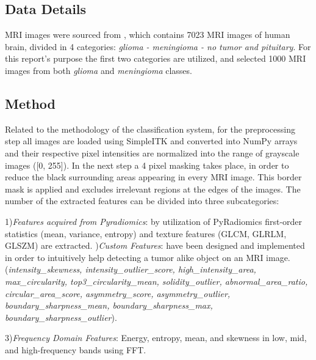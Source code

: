 \documentclass[11pt,a4paper]{article}
\begin{document}
    \subsection{Data Details}
	MRI images were sourced from \cite{data}, which contains 7023 MRI images of human brain, divided 
	in 4 categories: \textit{glioma - meningioma - no tumor and pituitary}.
	For this report's purpose the first two categories are utilized, and selected 1000 MRI images from both \textit{glioma} and
	\textit{meningioma} classes.

    \subsection{Method}
	
	\par Related to the methodology of the classification system, for the preprocessing step
	all images are loaded using SimpleITK
	and converted into NumPy arrays and their respective pixel intensities are 
	normalized into the range of grayscale images ([0, 255]).
	In the next step a 4 pixel masking takes place, in order to reduce the black surrounding areas
	appearing in every MRI image. This border mask is applied and excludes irrelevant regions at the 
	edges of the images. The number of the extracted features can be divided into three subcategories:

	1)\textit{Features acquired from Pyradiomics}: by utilization of PyRadiomics first-order statistics (mean, variance, entropy) and
	texture features (GLCM, GLRLM, GLSZM) are extracted.
	)\textit{Custom Features}: have been designed and implemented in order to intuitively help detecting a tumor alike
	object on an MRI image. (\textit{intensity\_skewness, intensity\_outlier\_score, high\_intensity\_area, max\_circularity,
	top3\_circularity\_mean, solidity\_outlier, abnormal\_area\_ratio, circular\_area\_score, asymmetry\_score, asymmetry\_outlier,
	boundary\_sharpness\_mean, boundary\_sharpness\_max, boundary\_sharpness\_outlier}).

	3)\textit{Frequency Domain Features}: Energy, entropy, mean, and skewness in low, mid, and high-frequency 
	bands using FFT.
	
\end{document}
